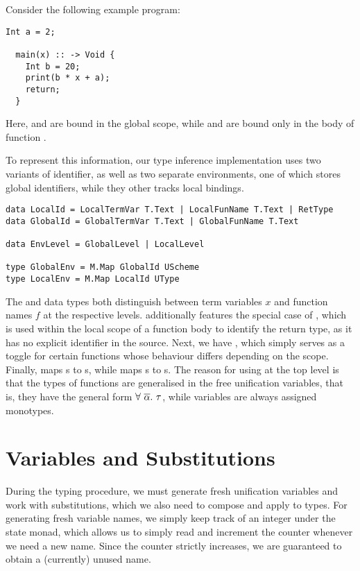 Consider the following example program:
%
\begin{lstlisting}[language=SPL]
  Int a = 2;

  main(x) :: -> Void {
    Int b = 20;
    print(b * x + a);
    return;
  }
\end{lstlisting}
%
Here,  and  are bound in the global scope, while  and
 are bound only in the body of function .

To represent this information, our type inference implementation uses two
variants of identifier, as well as two separate environments, one of which
stores global identifiers, while they other tracks local bindings.

\begin{verbatim}
data LocalId = LocalTermVar T.Text | LocalFunName T.Text | RetType
data GlobalId = GlobalTermVar T.Text | GlobalFunName T.Text

data EnvLevel = GlobalLevel | LocalLevel

type GlobalEnv = M.Map GlobalId UScheme
type LocalEnv = M.Map LocalId UType
\end{verbatim}

The  and  data types both distinguish between
term variables $x$ and function names $f$ at the respective levels.
 additionally features the special case of ,
which is used within the local scope of a function body to identify the return
type, as it has no explicit identifier in the source.
Next, we have , which simply serves as a toggle for certain
functions whose behaviour differs depending on the scope.
Finally,  maps s to s,
while  maps s to s.
The reason for using  at the top level is that the types of
functions are generalised in the free unification variables, that is, they have
the general form $\forall\ \set{\alpha}.\ \tau$, while variables are always
assigned monotypes.


\section{Variables and Substitutions}

During the typing procedure, we must generate fresh unification variables and
work with substitutions, which we also need to compose and apply to types.
For generating fresh variable names, we simply keep track of an integer
 under the state monad, which allows us to simply read and
increment the counter whenever we need a new name. Since the counter strictly
increases, we are guaranteed to obtain a (currently) unused name.

